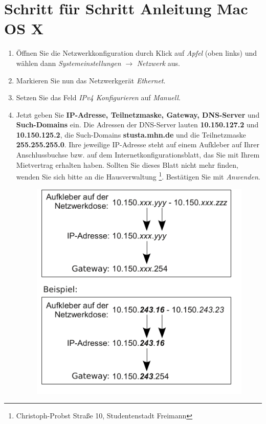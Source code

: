 \documentclass[a4paper,12pt]{scrartcl}
\begin{document}
\section*{Schritt für Schritt Anleitung Mac OS X}
\begin{enumerate}
    \item Öffnen Sie die Netzwerkkonfiguration durch Klick auf \emph{Apfel} (oben links) und wählen dann \emph{Systemeinstellungen} $\rightarrow$ \emph{Netzwerk} aus.
    \item Markieren Sie nun das Netzwerkgerät \emph{Ethernet}.
    \item Setzen Sie das Feld \emph{IPv4 Konfigurieren} auf \emph{Manuell}.
    \item Jetzt geben Sie \textbf{IP-Adresse, Teilnetzmaske, Gateway, DNS-Server} und \textbf{Such-Domains} ein. Die Adressen der DNS-Server lauten \textbf{10.150.127.2} und \textbf{10.150.125.2}, die Such-Domains \textbf{stusta.mhn.de} und die Teilnetzmaske \textbf{255.255.255.0}. Ihre jeweilige IP-Adresse steht auf einem Aufkleber auf Ihrer Anschlussbuchse bzw. auf dem Internetkonfigurationsblatt, das Sie mit Ihrem Mietvertrag erhalten haben. Sollten Sie dieses Blatt nicht mehr finden, wenden Sie sich bitte an die Hausverwaltung \footnote{Christoph-Probst Straße 10, Studentenstadt Freimann}. Bestätigen Sie mit \emph{Anwenden}.
      \begin{figure}[h!]
      \centering
        \begin{minipage}[c]{0.38\linewidth}
          \centering
          \includegraphics[width=\linewidth,keepaspectratio]{Bilder/IP_Gerneric}

\end{minipage}
\end{figure}
\end{enumerate}
\end{document}
